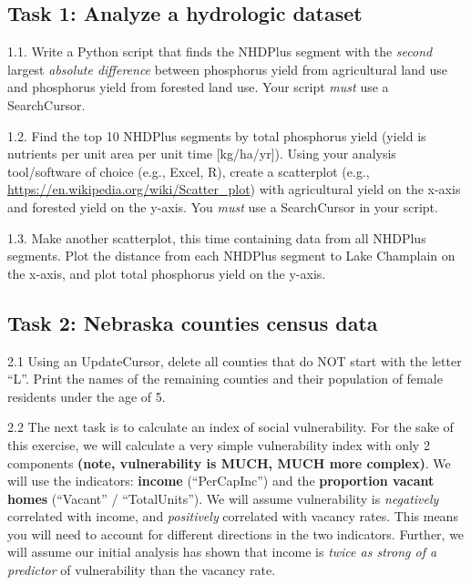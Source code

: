 \documentclass[]{article}
\begin{document}
\hypertarget{task-1-analyze-a-hydrologic-dataset}{%
\subsection{Task 1: Analyze a hydrologic
dataset}\label{task-1-analyze-a-hydrologic-dataset}}

1.1. Write a Python script that finds the NHDPlus segment with the
\emph{second} largest \emph{absolute difference} between phosphorus
yield from agricultural land use and phosphorus yield from forested land
use. Your script \emph{must} use a SearchCursor.

1.2. Find the top 10 NHDPlus segments by total phosphorus yield (yield
is nutrients per unit area per unit time {[}kg/ha/yr{]}). Using your
analysis tool/software of choice (e.g., Excel, R), create a scatterplot
(e.g., \url{https://en.wikipedia.org/wiki/Scatter_plot}) with
agricultural yield on the x-axis and forested yield on the y-axis. You
\emph{must} use a SearchCursor in your script.

1.3. Make another scatterplot, this time containing data from all
NHDPlus segments. Plot the distance from each NHDPlus segment to Lake
Champlain on the x-axis, and plot total phosphorus yield on the y-axis.

\hypertarget{task-2-nebraska-counties-census-data}{%
\subsection{Task 2: Nebraska counties census
data}\label{task-2-nebraska-counties-census-data}}

2.1 Using an UpdateCursor, delete all counties that do NOT start with
the letter ``L''. Print the names of the remaining counties and their
population of female residents under the age of 5.

2.2 The next task is to calculate an index of social vulnerability. For
the sake of this exercise, we will calculate a very simple vulnerability
index with only 2 components \textbf{(note, vulnerability is MUCH, MUCH
more complex)}. We will use the indicators: \textbf{income}
(``PerCapInc'') and the \textbf{proportion vacant homes} (``Vacant'' /
``TotalUnits''). We will assume vulnerability is \emph{negatively}
correlated with income, and \emph{positively} correlated with vacancy
rates. This means you will need to account for different directions in
the two indicators. Further, we will assume our initial analysis has
shown that income is \emph{twice as strong of a predictor} of
vulnerability than the vacancy rate.
\end{document}
